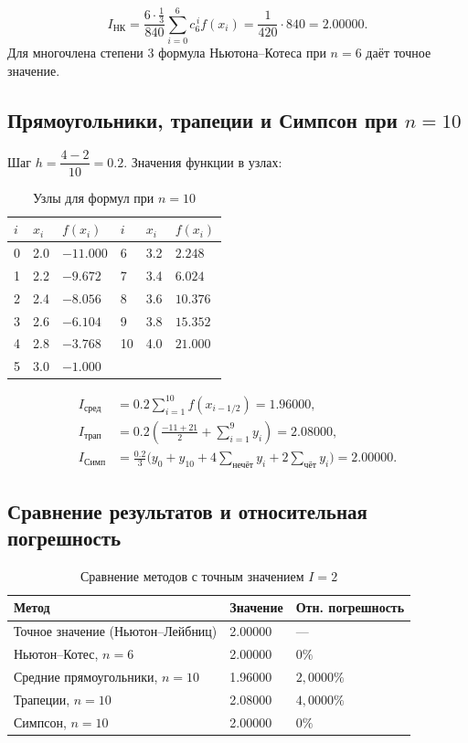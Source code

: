 \documentclass[12pt,a4paper]{article}
\begin{document}
\[
  I_{\text{НК}}=\frac{6\cdot\frac{1}{3}}{840}\sum_{i=0}^{6}c_6^{\,i}f(x_i)
  =\frac{1}{420}\cdot 840 = \boxed{2.00000}.
\]
Для многочлена степени 3 формула Ньютона--Котеса при $n=6$ даёт точное значение.

\subsection{Прямоугольники, трапеции и Симпсон при $n=10$}

Шаг $h=\dfrac{4-2}{10}=0.2$. Значения функции в узлах:

\begin{table}[H]
  \centering
  \caption{Узлы для формул при $n=10$}
  \begin{tabular}{C{1cm}C{1.8cm}C{2.4cm}C{1cm}C{1.8cm}C{2.4cm}}
    \toprule
    $i$ & $x_i$ & $f(x_i)$ & $i$ & $x_i$ & $f(x_i)$ \\
     & 2.0 & $-11.000$ & 6 & 3.2 & $2.248$ \\
    1 & 2.2 & $-9.672$ & 7 & 3.4 & $6.024$ \\
    2 & 2.4 & $-8.056$ & 8 & 3.6 & $10.376$ \\
    3 & 2.6 & $-6.104$ & 9 & 3.8 & $15.352$ \\
    4 & 2.8 & $-3.768$ & 10 & 4.0 & $21.000$ \\
    5 & 3.0 & $-1.000$ & & & \\
    \bottomrule
  \end{tabular}
\end{table}

\begin{align*}
  I_{\text{сред}} &= 0.2\sum_{i=1}^{10} f(x_{i-1/2}) = 1.96000, \\
  I_{\text{трап}} &= 0.2\left(\frac{-11+21}{2}+\sum_{i=1}^{9}y_i\right) = 2.08000, \\
  I_{\text{Симп}} &= \frac{0.2}{3}\bigl(y_0+y_{10}+4\textstyle\sum_{\text{нечёт}}y_i+2\sum_{\text{чёт}}y_i\bigr) = 2.00000.
\end{align*}

\subsection{Сравнение результатов и относительная погрешность}

\begin{table}[H]
  \centering
  \caption{Сравнение методов с точным значением $I=2$}
  \begin{tabular}{C{6.8cm}C{3cm}C{3.4cm}}
    \toprule
    \textbf{Метод} & \textbf{Значение} & \textbf{Отн. погрешность} \\
    \midrule
    Точное значение (Ньютон--Лейбниц) & 2.00000 & --- \\
    Ньютон--Котес, $n=6$ & 2.00000 & $0\%$ \\
    Средние прямоугольники, $n=10$ & 1.96000 & $2{,}0000\%$ \\
    Трапеции, $n=10$ & 2.08000 & $4{,}0000\%$ \\
    Симпсон, $n=10$ & 2.00000 & $0\%$ \\
    \bottomrule
  \end{tabular}
\end{table}
\end{document}
